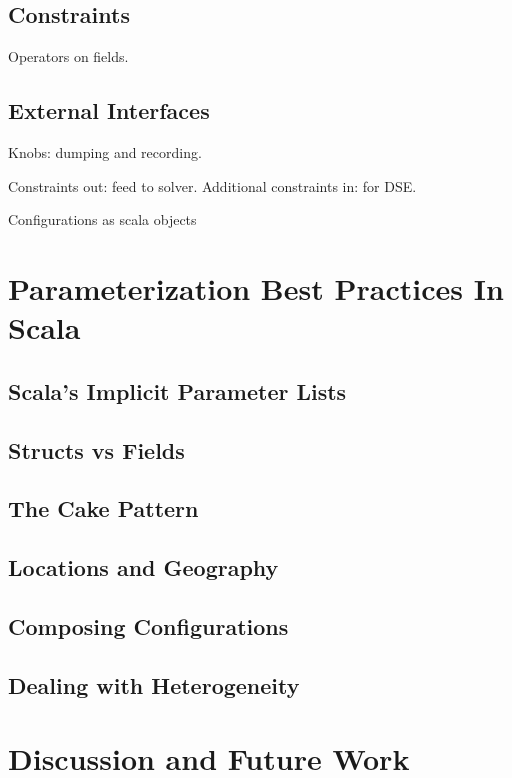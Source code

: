 \subsection{Constraints}

Operators on fields.

\subsection{External Interfaces}

Knobs: dumping and recording.

Constraints out: feed to solver.
Additional constraints in: for DSE.

Configurations as scala objects

\section{Parameterization Best Practices In Scala}

\subsection{Scala's Implicit Parameter Lists}

\subsection{Structs vs Fields}

\subsection{The Cake Pattern}

\subsection{Locations and Geography}

\subsection{Composing Configurations}

\subsection{Dealing with Heterogeneity}

\section{Discussion and Future Work}
\label{sec:con}

